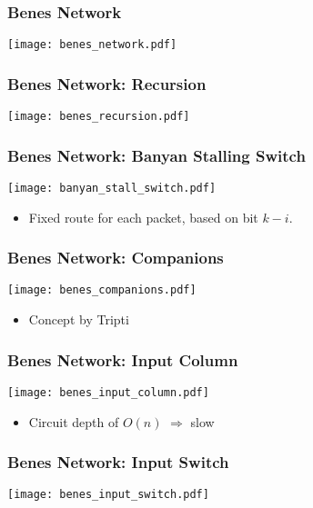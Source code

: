 \begin{frame}
	\frametitle{Benes Network}
	\begin{center}
		\texttt{[image: benes\_network.pdf]}
	\end{center}
\end{frame}

\begin{frame}
	\frametitle{Benes Network: Recursion}
	\begin{center}
		\texttt{[image: benes\_recursion.pdf]}
	\end{center}
\end{frame}

\begin{frame}
	\frametitle{Benes Network: Banyan Stalling Switch}
	\begin{center}
		\texttt{[image: banyan\_stall\_switch.pdf]}
	\end{center}
	\begin{itemize}
		\item Fixed route for each packet, based on bit $k - i$.
	\end{itemize}
\end{frame}
	
\begin{frame}
	\frametitle{Benes Network: Companions}
	\begin{center}
		\texttt{[image: benes\_companions.pdf]}
	\end{center}
	\begin{itemize}
		\item Concept by Tripti
	\end{itemize}
\end{frame}

\begin{frame}
	\frametitle{Benes Network: Input Column}
	\begin{center}
		\texttt{[image: benes\_input\_column.pdf]}
	\end{center}
	\begin{itemize}
		\item Circuit depth of $O(n)$ $\Rightarrow$ slow
	\end{itemize}
\end{frame}
	
\begin{frame}
	\frametitle{Benes Network: Input Switch}
	\begin{center}
		\texttt{[image: benes\_input\_switch.pdf]}
	\end{center}
\end{frame}
	

